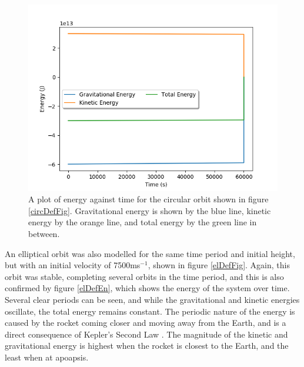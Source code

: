 \documentclass[twocolumn,prl,nobalancelastpage,aps,10pt]{revtex4-1}
\begin{document}
\begin{figure}[ht]
	\includegraphics*[width=0.96\linewidth,clip]{circularDefaultEnergy}
	\caption{A plot of energy against time for the circular orbit shown in figure \ref{circDefFig}. Gravitational energy is shown by the blue line, kinetic energy by the orange line, and total energy by the green line in between.} \label{circDefEn}
\end{figure}

An elliptical orbit was also modelled for the same time period and initial height, but with an initial velocity of 7500ms$^{-1}$, shown in figure \ref{elDefFig}. Again, this orbit was stable, completing several orbits in the time period, and this is also confirmed by figure \ref{elDefEn}, which shows the energy of the system over time. Several clear periods can be seen, and while the gravitational and kinetic energies oscillate, the total energy remains constant. The periodic nature of the energy is caused by the rocket coming closer and moving away from the Earth, and is a direct consequence of Kepler's Second Law \cite{Kepler1992}. The magnitude of the kinetic and gravitational energy is highest when the rocket is closest to the Earth, and the least when at apoapsis.
\end{document}
